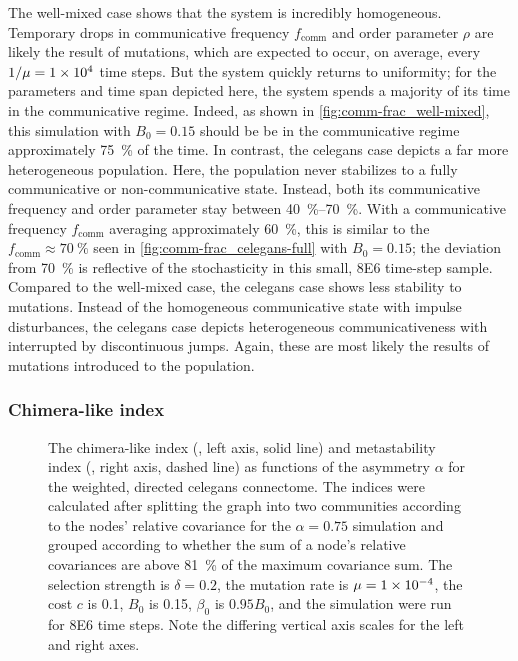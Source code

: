 \documentclass[pdflatex,lineno,referee,sn-mathphys-ay]{sn-jnl}
\begin{document}
The  well-mixed case
shows that the system is incredibly homogeneous.
Temporary drops in communicative frequency $f_{\text{comm}}$
and order parameter $\rho$ are likely the result of mutations,
which are expected to occur, on average, every $1/\mu = \num{1E4}$ time steps.
But the system quickly returns to uniformity;
for the parameters and time span depicted here,
the system spends a majority of its time in the communicative regime.
Indeed, as shown in \cref{fig:comm-frac_well-mixed},
this simulation with $B_0 = 0.15$ should be be in the communicative regime
approximately \SI{75}{\percent} of the time.
In contrast, the  \gls{celegans} case
depicts a far more heterogeneous population.
Here, the population never stabilizes
to a fully communicative or non-communicative state.
Instead, both its communicative frequency and order parameter
stay between \SIrange{40}{70}{\percent}.
With a communicative frequency $f_{\text{comm}}$ averaging approximately \SI{60}{\percent},
this is similar to the $f_{\text{comm}} \approx \SI{70}{\percent}$ seen
in \cref{fig:comm-frac_celegans-full} with $B_0 = 0.15$;
the deviation from \SI{70}{\percent} is reflective of the
stochasticity in this small, \num{8E6} time-step sample.
Compared to the  well-mixed case,
the \gls{celegans} case shows less stability to mutations.
Instead of the homogeneous communicative state with impulse disturbances,
the \gls{celegans} case depicts heterogeneous communicativeness
with interrupted by discontinuous jumps.
Again, these are most likely the results of mutations introduced
to the population.

\subsubsection{Chimera-like index}
\begin{figure}
  \centering
  \pgfplotsset{width=0.4\textwidth}
  
  \caption{
    The chimera-like index (, left axis, solid line)
    and metastability index (,
    right axis, dashed line)
    as functions of the asymmetry $\alpha$
    for the
    weighted, directed \gls{celegans} connectome.
    The indices were calculated after splitting the graph
    into two communities according to the nodes' relative covariance
    for the $\alpha = \num{0.75}$ simulation
    and grouped according to whether the sum
    of a node's relative covariances are above
    \SI{81}{\percent} of the maximum covariance sum.
    The selection strength is $\delta=0.2$,
    the mutation rate is $\mu=\num{1E-4}$,
    the cost $c$ is \num{0.1},
    $B_0$ is \num{0.15},
    $\beta_0$ is $\num{0.95} B_0$,
    and the simulation were run for \num{8E6} time steps.
    Note the differing vertical axis scales
    for the left and right axes.
  }
  \label{fig:chimera-index}
\end{figure}
\end{document}
